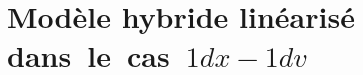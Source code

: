 \renewcommand{\localPath}{chap2}

\chapter{Modèle hybride linéarisé dans~le~cas~$1dx-1dv$}










\begin{subappendices}

\end{subappendices}

